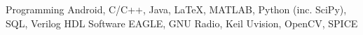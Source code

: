 \begin{cvskills}
\cvskill
{Programming} %
{Android, C/C++, Java, LaTeX, MATLAB, Python (inc. SciPy), SQL, Verilog HDL} %
\cvskill
{Software} %
{EAGLE, GNU Radio, Keil Uvision, OpenCV, SPICE} %
\end{cvskills}
